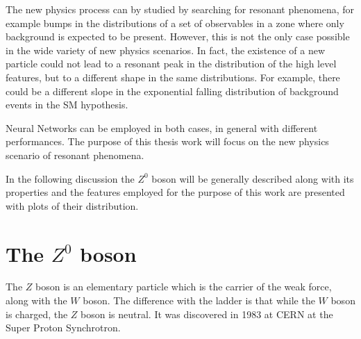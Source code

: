 The new physics process can by studied by searching for resonant phenomena, for example bumps in the distributions of a set of observables in a zone where only background is expected to be present. However, this is not the only case possible in the wide variety of new physics scenarios. In fact, the existence of a new particle could not lead to a resonant peak in the distribution of the high level features, but to a different shape in the same distributions. For example, there could be a different slope in the exponential falling distribution of background events in the SM hypothesis.

Neural Networks can be employed in both cases, in general with different performances. The purpose of this thesis work will focus on the new physics scenario of resonant phenomena.

In the following discussion the $Z^{0}$ boson will be generally described along with its properties and the features employed for the purpose of this work are presented with plots of their distribution.





\section{The $Z^{0}$ boson}
The $Z$ boson is an elementary particle which is the carrier of the weak force, along with the $W$ boson. The difference with the ladder is that while the $W$ boson is charged, the $Z$ boson is neutral. It was discovered in 1983 at CERN at the Super Proton Synchrotron.


